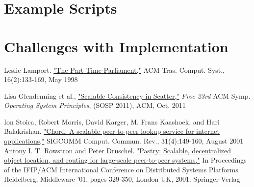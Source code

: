 \documentclass{amsart}
\theoremstyle{definition}
\theoremstyle{remark}
\numberwithin{equation}{section}
\begin{document}
\section{Example Scripts}

\section{Challenges with Implementation}
\begin{thebibliography}{7}
Leslie Lamport. \href{http://research.microsoft.com/en-us/um/people/lamport/pubs/lamport-paxos.pdf}{"The Part-Time Parliament,"} ACM Tras. Comput. Syst., 16(2):133-169, May 1998

Lisa Glendenning et al.,  \href{http://homes.cs.washington.edu/~arvind/papers/scatter.pdf}{"Scalable Consistency in Scatter,"} \textit{Proc 23rd} ACM
Symp. \textit{Operating System Principles}, (SOSP 2011), ACM, Oct. 2011

Ion Stoica, Robert Morris, David Karger, M. Frans Kaashoek, and Hari Balakrishan. \href{http://pdos.csail.mit.edu/papers/chord:sigcomm01/chord_sigcomm.pdf}{"Chord: A scalable peer-to-peer lookup service for internet applications,"} 
SIGCOMM Comput. Commun. Rev., 31(4):149-160, August 2001
Antony I. T. Rowstron and Peter Druschel. \href{http://www.cs.unibo.it/~babaoglu/courses/cas12-13/resources/tutorials/pastry.pdf}{"Pastry: Scalable, decentralized object location, and routing for large-scale peer-to-peer systems,"} 
In Proceedings of the IFIP/ACM International Conference on Distributed Systems Platforms Heidelberg, Middleware '01, 
pages 329-350, London UK, 2001. Springer-Verlag


\end{thebibliography}
\end{document}
